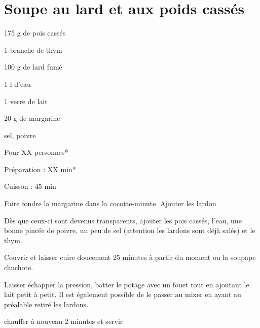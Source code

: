 \section{Soupe au lard et aux poids cassés}

\begin{ingredients}
\item 175 g de pois cassés
\item 1 branche de thym
\item 100 g de lard fumé
\item 1 l d'eau
\item 1 verre de lait
\item 20 g de margarine
\item sel, poivre
\end{ingredients}
\begin{infos}
\item Pour XX personnes*		%
\item Préparation : XX min*		%
\item Cuisson : 45 min			%
\end{infos}
\begin{etapes}
\item Faire fondre la margarine dans la cocotte-minute. Ajouter les lardon
\item Dès que ceux-ci sont devenus transparents, ajouter les pois cassés, l'eau, une bonne pincée de poivre, un peu de sel (attention les lardons sont déjà salés) et le thym.
\item Couvrir et laisser cuire doucement 25 minutes à partir du moment ou la soupape chuchote.
\item Laisser échapper la pression, batter le potage avec un fouet tout en ajoutant le lait petit à petit. Il est également possible de le passer au mixer en ayant au préalable retiré les lardons.
\item chauffer à nouveau 2 minutes et servir
\end{etapes}
\begin{conseils}
\end{conseils}
